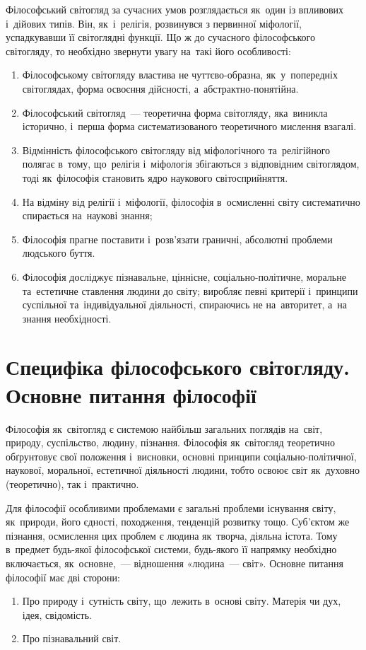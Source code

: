\documentclass[a5paper,oneside,DIV=12,12pt,headings=small]{scrartcl}
\begin{document}
		Філософський світогляд за сучасних умов розглядається як~один із впливових і~дійових типів. Він, як~і~релігія, розвинувся з первинної міфології, успадкувавши її світоглядні функції. Що ж до сучасного філософського світогляду, то необхідно звернути увагу на~такі його особливості:
		\begin{enumerate}
			\item Філософському світогляду властива не чут\-тє\-во-об\-раз\-на, як~у~попередніх світоглядах, форма освоєння дійсності, а~абс\-тракт\-но-по\-ня\-тій\-на.
			\item Філософський світогляд~— теоретична форма світогляду, яка~виникла історично, і~перша форма систематизованого теоретичного мислення взагалі.
			\item Відмінність філософського світогляду від міфологічного та~релігійного полягає в~тому, що~релігія і~міфологія збігаються з відповідним світоглядом, тоді як~філософія становить ядро наукового світосприйняття.
			\item На відміну від релігії і~міфології, філософія в~осмисленні світу систематично спирається на~наукові знання;
			\item Філософія прагне поставити і~розв'язати граничні, абсолютні проблеми людського буття.
			\item Філософія досліджує пізнавальне, ціннісне, со\-ці\-аль\-но-по\-лі\-тич\-не, моральне та~естетичне ставлення людини до світу; виробляє певні критерії і~принципи суспільної та~індивідуальної діяльності, спираючись не на~авторитет, а~на знання необхідності.
		\end{enumerate}
		
	\section{Специфіка філософського світогляду. Основне питання філософії}
		Філософія як~світогляд є системою найбільш загальних поглядів на~світ, природу, суспільство, людину, пізнання. Філософія як~світогляд теоретично обґрунтовує свої положення і~висновки, основні принципи соціально-політичної, наукової, моральної, естетичної діяльності людини, тобто освоює світ як~духовно (теоретично), так і~практично.
		
		Для філософії особливими проблемами є загальні проблеми існування світу, як~природи, його єдності, походження, тенденцій розвитку тощо. Суб'єктом же пізнання, осмислення цих проблем є людина як~творча, діяльна істота. Тому в~предмет будь-якої філософської системи, будь-якого її напрямку необхідно включається, як~основне,~— відношення «людина~— світ».
		Основне питання філософії має дві сторони:
		\begin{enumerate}
			\item Про природу і~сутність світу, що~лежить в~основі світу. Матерія чи дух, ідея, свідомість.
			\item Про пізнавальний світ.
		\end{enumerate}
		
\end{document}
